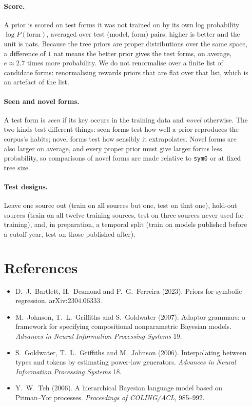 \documentclass[11pt]{article}
\begin{document}
\paragraph{Score.} A prior is scored on test forms it was not trained on by its own log probability
$\log P(\text{form})$, averaged over test (model, form) pairs; higher is better and the unit is nats.
Because the tree priors are proper distributions over the same space, a difference of $1$ nat means the
better prior gives the test forms, on average, $e \approx 2.7$ times more probability. We do not
renormalise over a finite list of candidate forms: renormalising rewards priors that are flat over that
list, which is an artefact of the list.

\paragraph{Seen and novel forms.} A test form is \emph{seen} if its key occurs in the training data and
\emph{novel} otherwise. The two kinds test different things: seen forms test how well a prior
reproduces the corpus's habits; novel forms test how sensibly it extrapolates. Novel forms are also
larger on average, and every proper prior must give larger forms less probability, so comparisons of
novel forms are made relative to \texttt{sym0} or at fixed tree size.

\paragraph{Test designs.} Leave one source out (train on all sources but one, test on that one),
hold-out sources (train on all twelve training sources, test on three sources never used for training),
and, in preparation, a temporal split (train on models published before a cutoff year, test on those
published after).

\section*{References}
\begin{itemize}
  \item D.~J.~Bartlett, H.~Desmond and P.~G.~Ferreira (2023). Priors for symbolic regression.
  arXiv:2304.06333.
  \item M.~Johnson, T.~L.~Griffiths and S.~Goldwater (2007). Adaptor grammars: a framework for
  specifying compositional nonparametric Bayesian models. \emph{Advances in Neural Information
  Processing Systems} 19.
  \item S.~Goldwater, T.~L.~Griffiths and M.~Johnson (2006). Interpolating between types and tokens by
  estimating power-law generators. \emph{Advances in Neural Information Processing Systems} 18.
  \item Y.~W.~Teh (2006). A hierarchical Bayesian language model based on Pitman--Yor processes.
  \emph{Proceedings of COLING/ACL}, 985--992.
\end{itemize}
\end{document}
